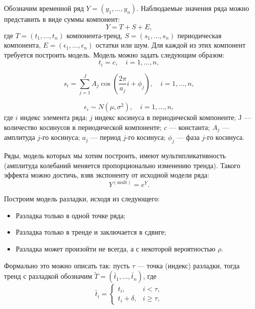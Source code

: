 \documentclass[%
12pt,
master,  %
natbib,      %
subf,        %
substylefile = spbu.rtx,
href,        %
colorlinks,  %
]{disser}
\begin{document}
Обозначим временной ряд $Y = (y_1, \dots, y_n)$. Наблюдаемые значения ряда можно представить в виде суммы компонент:
\begin{equation*}
Y = T + S + E ,
\end{equation*}
где  $ T = (t_1, \dots, t_n) $ компонента-тренд, $ S = (s_1, \dots, s_n) $ периодическая компонента, $ E = (\epsilon_1, \dots, \epsilon_n) $ остатки или шум.
Для каждой из этих компонент требуется построить модель. Модель можно задать следующим образом:
\begin{equation*}
t_i = c, \quad i = 1, \dots, n, 
\end{equation*}

\begin{equation*}
s_i = \sum_{j=1}^{J}{A_j \cos \left( \frac{2\pi}{a_j} i + \phi_j \right)}, \quad i = 1, \dots, n,
\end{equation*}

\begin{equation*}
\epsilon_i \sim N(\mu, \sigma^2), \quad i = 1, \dots, n, 
\end{equation*}
где $i$ индекс элемента ряда; $j$ индекс косинуса в периодической компоненте; J --- количество косинусов в периодической компоненте; $c$ --- константа; $A_j$ --- амплитуда $j$-го косинуса; $a_j$ --- период $j$-го косинуса; $\phi_j$ --- фаза $j$-го косинуса.

Ряды, модель которых мы хотим построить, имеют мультипликативность (амплитуда колебаний меняется пропорционально изменению тренда). Такого эффекта можно достичь, взяв экспоненту от исходной модели ряда:
\begin{equation*}
Y^{\mathrm{(mult)}} = e^{Y}. 
\end{equation*}

Построим модель разладки, исходя из следующего:
\begin{itemize}
	\item Разладка только в одной точке ряда;
	\item Разладка только в тренде и заключается в сдвиге;
	\item Разладка может произойти не всегда, а с некоторой вероятностью $\rho$.
\end{itemize}
Формально это можно описать так: пусть $\tau$ --- точка (индекс) разладки, тогда тренд с разладкой обозначим $ \tilde{T} = (\tilde{t_1}, \dots, \tilde{t_n}) $, где
\begin{equation*}
\tilde{t_i} =
	\begin{cases}
		t_i, & i < \tau, \\
		t_i + \delta, & i \geqslant \tau,
	\end{cases}
\end{equation*}
\end{document}
